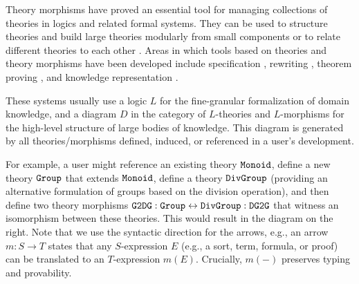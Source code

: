 Theory morphisms have proved an essential tool for managing collections of theories in logics and related formal systems.
They can be used to structure theories and build large theories modularly from small components or to relate different theories to each other \cite{asl,devgraphs,littletheories}.
Areas in which tools based on theories and theory morphisms have been developed include specification \cite{obj,hets}, rewriting \cite{maude}, theorem proving \cite{imps}, and knowledge representation \cite{RK:mmt:10}.


These systems usually use a logic $L$ for the fine-granular formalization of domain knowledge, and a diagram $D$ in the category of $L$-theories and $L$-morphisms for the high-level structure of large bodies of knowledge.
This diagram is generated by all theories/morphisms defined, induced, or referenced in a user's development.

\begin{wrapfigure}{r}{5.5cm}
\vspace{-3em}
\vspace{-3.5em}
\end{wrapfigure}

For example, a user might reference an existing theory $\operatorname{\mathtt{Monoid}}$, define a new theory $\operatorname{\mathtt{Group}}$ that extends $\operatorname{\mathtt{Monoid}}$, define a theory $\operatorname{\mathtt{DivGroup}}$ (providing an alternative formulation of groups based on the division operation), and then define two theory morphisms $\operatorname{\mathtt{G2DG}}:\operatorname{\mathtt{Group}}\leftrightarrow \operatorname{\mathtt{DivGroup}}:\operatorname{\mathtt{DG2G}}$ that witness an isomorphism between these theories.
This would result in the diagram on the right.
Note that we use the syntactic direction for the arrows, e.g., an arrow $m:S\to T$ states that any $S$-expression $E$ (e.g., a sort, term, formula, or proof) can be translated to an $T$-expression $m(E)$.
Crucially, $m(-)$ preserves typing and provability.

